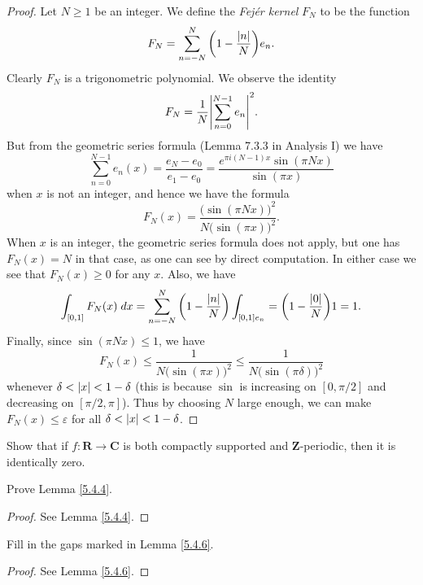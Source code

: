 \begin{proof}
    Let \(N \geq 1\) be an integer.
    We define the \emph{Fejér kernel} \(F_N\) to be the function
    \[
        F_N = \sum_{n = -N}^N \bigg(1 - \frac{\abs*{n}}{N}\bigg) e_n.
    \]
    Clearly \(F_N\) is a trigonometric polynomial.
    We observe the identity
    \[
        F_N = \frac{1}{N} \abs*{\sum_{n = 0}^{N - 1} e_n}^2.
    \]
    But from the geometric series formula (Lemma 7.3.3 in Analysis I) we have
    \[
        \sum_{n = 0}^{N - 1} e_n(x) = \frac{e_N - e_0}{e_1 - e_0} = \frac{e^{\pi i (N - 1) x} \sin(\pi N x)}{\sin(\pi x)}
    \]
    when \(x\) is not an integer, and hence we have the formula
    \[
        F_N(x) = \frac{\big(\sin(\pi N x)\big)^2}{N \big(\sin(\pi x)\big)^2}.
    \]
    When \(x\) is an integer, the geometric series formula does not apply, but one has \(F_N(x) = N\) in that case, as one can see by direct computation.
    In either case we see that \(F_N(x) \geq 0\) for any \(x\).
    Also, we have
    \[
        \int_{[0, 1]} F_N(x) \; dx = \sum_{n = -N}^N \bigg(1 - \frac{\abs*{n}}{N}\bigg) \int_{[0, 1] e_n} = \bigg(1 - \frac{\abs*{0}}{N}\bigg) 1 = 1.
    \]
    Finally, since \(\sin(\pi N x) \leq 1\), we have
    \[
        F_N(x) \leq \frac{1}{N \big(\sin(\pi x)\big)^2} \leq \frac{1}{N \big(\sin(\pi \delta)\big)^2}
    \]
    whenever \(\delta < \abs*{x} < 1 - \delta\)
    (this is because \(\sin\) is increasing on \([0, \pi / 2]\) and decreasing on \([\pi / 2, \pi]\)).
    Thus by choosing \(N\) large enough, we can make \(F_N (x) \leq \varepsilon\) for all \(\delta < \abs*{x} < 1 - \delta\).
\end{proof}

\exercisesection

\begin{exercise}\label{ex 5.4.1}
    Show that if \(f : \mathbf{R} \to \mathbf{C}\) is both compactly supported and \(\mathbf{Z}\)-periodic, then it is identically zero.
\end{exercise}

\begin{exercise}\label{ex 5.4.2}
    Prove Lemma \ref{5.4.4}.
\end{exercise}

\begin{proof}
    See Lemma \ref{5.4.4}.
\end{proof}

\begin{exercise}\label{ex 5.4.3}
    Fill in the gaps marked in Lemma \ref{5.4.6}.
\end{exercise}

\begin{proof}
    See Lemma \ref{5.4.6}.
\end{proof}